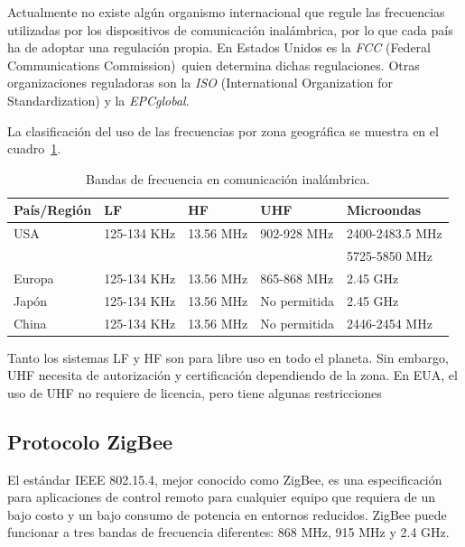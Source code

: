 Actualmente no existe algún organismo internacional que regule las frecuencias utilizadas por los dispositivos de comunicación inalámbrica, por lo que cada país ha de adoptar una regulación propia. En Estados Unidos es la \textit{FCC} (Federal Communications Commission\footnotemark)~quien determina dichas regulaciones. Otras organizaciones reguladoras son la \textit{ISO} (International Organization for Standardization\footnotemark) y la \textit{EPCglobal}.


La clasificación del uso de las frecuencias por zona geográfica se muestra en el cuadro~\ref{Tab:BandasFreq}.

\begin{table}[H]
\begin{center}
\caption{Bandas de frecuencia en comunicación inalámbrica.}
\label{Tab:BandasFreq}
\begin{tabular}{|l|l|l|l|l|}
	\hline
	\textbf{País/Región} & \textbf{LF} & \textbf{HF} & \textbf{UHF} & \textbf{Microondas}\\
	\hline
	USA & 125-134 KHz & 13.56 MHz & 902-928 MHz & 2400-2483.5 MHz\\& & & & 5725-5850 MHz \\
	\hline
	Europa & 125-134 KHz & 13.56 MHz & 865-868 MHz & 2.45 GHz \\
	\hline
	Japón & 125-134 KHz & 13.56 MHz & No permitida & 2.45 GHz \\
	\hline
	China & 125-134 KHz & 13.56 MHz & No permitida & 2446-2454 MHz \\
	\hline
\end{tabular}
\end{center}
\end{table}

Tanto los sistemas LF y HF son para libre uso en todo el planeta. Sin embargo, UHF necesita de autorización y certificación dependiendo de la zona. En EUA, el uso de UHF no requiere de licencia, pero tiene algunas restricciones \citep{tapia2007identificacion}

\subsection{Protocolo ZigBee}

El estándar IEEE 802.15.4, mejor conocido como ZigBee, es una especificación para aplicaciones de control remoto para cualquier equipo que requiera de un bajo costo y un bajo consumo de potencia en entornos reducidos. ZigBee puede funcionar a tres bandas de frecuencia diferentes: 868 MHz, 915 MHz y 2.4 GHz. \\

